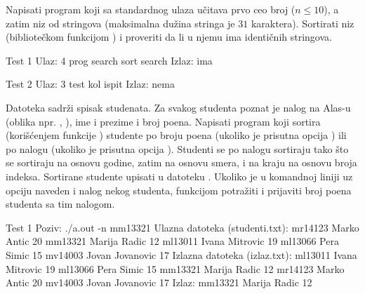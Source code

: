 \begin{Answer}[ref=522]
\end{Answer}
\begin{Exercise}[label=523]
  Napisati program koji sa standardnog ulaza učitava prvo ceo broj
   ($n \leq 10$), a zatim niz  od  stringova
  (maksimalna dužina stringa je $31$ karaktera). Sortirati niz
   (bibliotečkom funkcijom ) i proveriti da li u
  njemu ima identičnih stringova.
  
\begin{miditest}
\begin{test}{Test 1}
Ulaz:   4 prog search sort search
Izlaz:  ima
\end{test}
\end{miditest}
\begin{miditest}
\begin{test}{Test 2}
Ulaz:   3 test kol ispit
Izlaz:  nema
\end{test}
\end{miditest}
  
\end{Exercise}

\begin{Answer}[ref=523]
\end{Answer}
\begin{Exercise}[label=524]
  Datoteka  sadrži spisak studenata. Za svakog
  studenta poznat je nalog na Alas-u (oblika npr. ,
  ), ime i prezime i broj poena. Napisati program koji
  sortira (korišćenjem funkcije ) studente po broju poena
  (ukoliko je prisutna opcija ) ili po nalogu (ukoliko je
  prisutna opcija ). Studenti se po nalogu sortiraju tako što
  se sortiraju na osnovu godine, zatim na osnovu smera, i na kraju na
  osnovu broja indeksa. Sortirane studente upisati u datoteku
  . Ukoliko je u komandnoj liniji uz opciju 
  naveden i nalog nekog studenta, funkcijom  potražiti
  i prijaviti broj poena studenta sa tim nalogom.
  
\begin{maxitest}
\begin{test}{Test 1}
Poziv: ./a.out -n mm13321
Ulazna datoteka (studenti.txt):
  mr14123 Marko Antic 20
  mm13321 Marija Radic 12
  ml13011 Ivana Mitrovic 19
  ml13066 Pera Simic 15
  mv14003 Jovan Jovanovic 17
Izlazna datoteka (izlaz.txt):
  ml13011 Ivana Mitrovic 19
  ml13066 Pera Simic 15
  mm13321 Marija Radic 12
  mr14123 Marko Antic 20
  mv14003 Jovan Jovanovic 17
Izlaz:
  mm13321 Marija Radic 12
\end{test}
\end{maxitest}
  
\end{Exercise}

